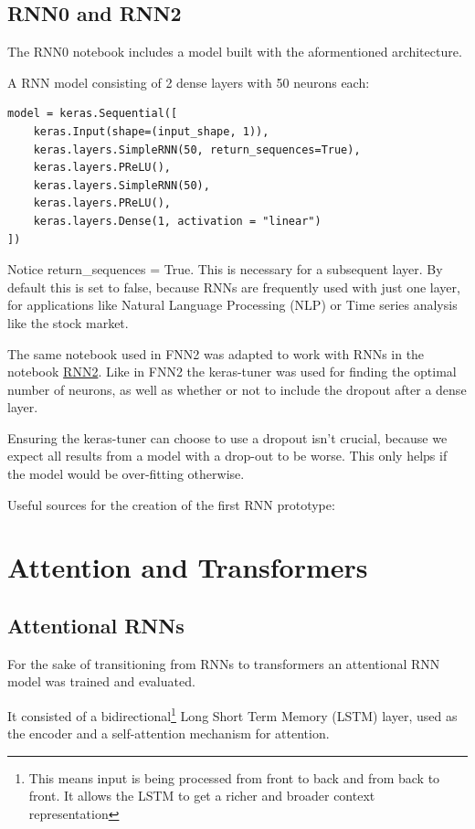 \documentclass{article}
\begin{document}
\subsection{RNN0 and RNN2}
The RNN0 notebook includes a model built with the aformentioned architecture.

A RNN model consisting of 2 dense layers with 50 neurons each:

\begin{Verbatim}
model = keras.Sequential([
    keras.Input(shape=(input_shape, 1)),
    keras.layers.SimpleRNN(50, return_sequences=True),
    keras.layers.PReLU(),
    keras.layers.SimpleRNN(50),
    keras.layers.PReLU(),
    keras.layers.Dense(1, activation = "linear")
])
\end{Verbatim}
Notice return\_sequences = True. This is necessary for a subsequent layer. 
By default this is set to false, because RNNs are frequently used with just 
one layer, for applications like Natural Language Processing (NLP) or Time 
series analysis like the stock market.

The same notebook used in FNN2 was adapted to work with RNNs in the notebook 
\href{https://github.com/AntonStantan/matura/blob/main/RNN/RNN2.ipynb}{RNN2}. 
Like in FNN2 the keras-tuner was used for finding the optimal number of 
neurons, as well as whether or not to include the dropout after a dense 
layer.

Ensuring the keras-tuner can choose to use a dropout isn't crucial, because 
we expect all results from a model with a drop-out to be worse. This only 
helps if the model would be over-fitting otherwise.


Useful sources for the creation of the first RNN prototype:
\cite{bowman2015recursiveneuralnetworkslearn, tensorflow_keras_rnn,ibm_rnn}


\section{Attention and Transformers}

\subsection{Attentional RNNs}
For the sake of transitioning from RNNs to transformers an attentional RNN 
model was trained and evaluated.

It consisted of a bidirectional\footnote{This means input is being processed 
from front to back and from back to front. It allows the LSTM to get a 
richer and broader context representation} Long Short Term Memory (LSTM) 
layer, used as the encoder and a self-attention mechanism for attention. 
\end{document}
